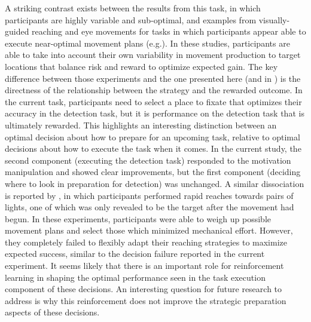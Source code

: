 \documentclass[vision,article,submit,moreauthors,pdftex,10pt,a4paper]{mdpi}
\begin{document}
A striking contrast exists between the results from this task, in which participants are highly variable and sub-optimal, and examples from visually-guided reaching and eye movements for tasks in which participants appear able to execute near-optimal movement plans (e.g.\cite{trommershauser2006humans,trommershauser2005optimal}). In these studies, participants are able to take into account their own variability in movement production to target locations that balance risk and reward to optimize expected gain. The key difference between those experiments and the one presented here (and in \cite{morvan2012human, clarke2015failure, james2017failure, Huntlearning}) is the directness of the relationship between the strategy and the rewarded outcome. In the current task, participants need to select a place to fixate that optimizes their accuracy in the detection task, but it is performance on the detection task that is ultimately rewarded. This highlights an interesting distinction between an optimal decision about how to prepare for an upcoming task, relative to optimal decisions about how to execute the task when it comes. In the current study, the second component (executing the detection task) responded to the motivation manipulation and showed clear improvements, but the first component (deciding where to look in preparation for detection) was unchanged. A similar dissociation is reported by \cite{Hessereaching}, in which participants performed rapid reaches towards pairs of lights, one of which was only revealed to be the target after the movement had begun. In these experiments, participants were able to weigh up possible movement plans and select those which minimized mechanical effort. However, they completely failed to flexibly adapt their reaching strategies to maximize expected success, similar to the decision failure reported in the current experiment. It seems likely that there is an important role for reinforcement learning in shaping the optimal performance seen in the task execution component of these decisions. An interesting question for future research to address is why this reinforcement does not improve the strategic preparation aspects of these decisions. 
\end{document}
